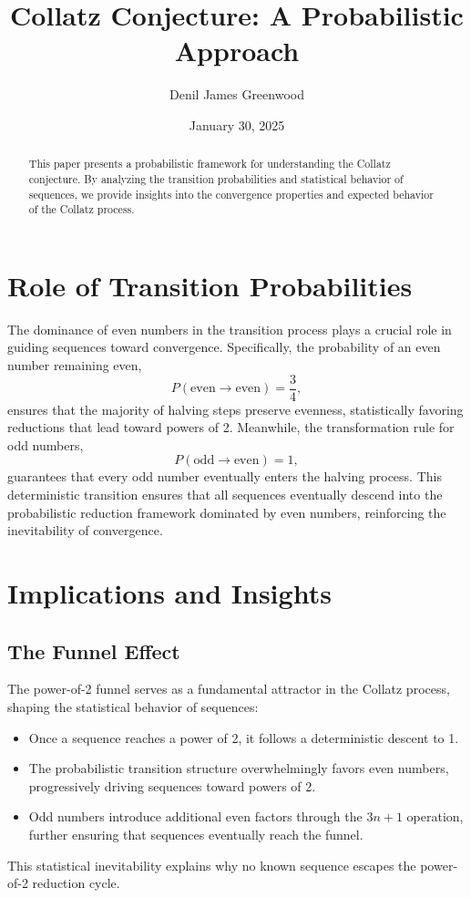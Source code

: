 \documentclass{article}
\title{Collatz Conjecture: A Probabilistic Approach}
\author{Denil James Greenwood}
\date{January 30, 2025}
\begin{document}
\maketitle

\begin{abstract}
This paper presents a probabilistic framework for understanding the Collatz conjecture. By analyzing the transition probabilities and statistical behavior of sequences, we provide insights into the convergence properties and expected behavior of the Collatz process.
\end{abstract}


\section{Role of Transition Probabilities}
The dominance of even numbers in the transition process plays a crucial role in guiding sequences toward convergence. Specifically, the probability of an even number remaining even,
\[
P(\text{even} \rightarrow \text{even}) = \frac{3}{4},
\]
ensures that the majority of halving steps preserve evenness, statistically favoring reductions that lead toward powers of 2. Meanwhile, the transformation rule for odd numbers,
\[
P(\text{odd} \rightarrow \text{even}) = 1,
\]
guarantees that every odd number eventually enters the halving process. This deterministic transition ensures that all sequences eventually descend into the probabilistic reduction framework dominated by even numbers, reinforcing the inevitability of convergence.

\section{Implications and Insights}
\subsection{The Funnel Effect}
The power-of-2 funnel serves as a fundamental attractor in the Collatz process, shaping the statistical behavior of sequences:
\begin{itemize}
    \item Once a sequence reaches a power of 2, it follows a deterministic descent to 1.
    \item The probabilistic transition structure overwhelmingly favors even numbers, progressively driving sequences toward powers of 2.
    \item Odd numbers introduce additional even factors through the $3n+1$ operation, further ensuring that sequences eventually reach the funnel.
\end{itemize}
This statistical inevitability explains why no known sequence escapes the power-of-2 reduction cycle.
\end{document}
